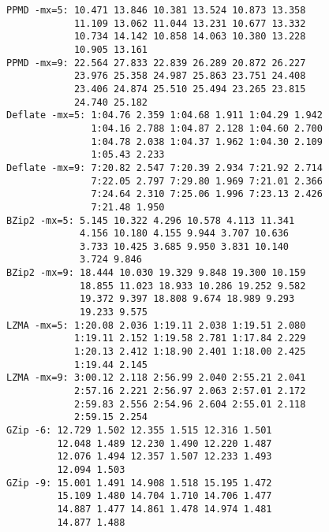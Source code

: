 \begin{verbatim}
PPMD -mx=5: 10.471 13.846 10.381 13.524 10.873 13.358
            11.109 13.062 11.044 13.231 10.677 13.332
            10.734 14.142 10.858 14.063 10.380 13.228
            10.905 13.161
PPMD -mx=9: 22.564 27.833 22.839 26.289 20.872 26.227
            23.976 25.358 24.987 25.863 23.751 24.408
            23.406 24.874 25.510 25.494 23.265 23.815
            24.740 25.182
Deflate -mx=5: 1:04.76 2.359 1:04.68 1.911 1:04.29 1.942
               1:04.16 2.788 1:04.87 2.128 1:04.60 2.700
               1:04.78 2.038 1:04.37 1.962 1:04.30 2.109
               1:05.43 2.233
Deflate -mx=9: 7:20.82 2.547 7:20.39 2.934 7:21.92 2.714
               7:22.05 2.797 7:29.80 1.969 7:21.01 2.366
               7:24.64 2.310 7:25.06 1.996 7:23.13 2.426
               7:21.48 1.950
BZip2 -mx=5: 5.145 10.322 4.296 10.578 4.113 11.341
             4.156 10.180 4.155 9.944 3.707 10.636
             3.733 10.425 3.685 9.950 3.831 10.140
             3.724 9.846
BZip2 -mx=9: 18.444 10.030 19.329 9.848 19.300 10.159
             18.855 11.023 18.933 10.286 19.252 9.582
             19.372 9.397 18.808 9.674 18.989 9.293
             19.233 9.575
LZMA -mx=5: 1:20.08 2.036 1:19.11 2.038 1:19.51 2.080
            1:19.11 2.152 1:19.58 2.781 1:17.84 2.229
            1:20.13 2.412 1:18.90 2.401 1:18.00 2.425
            1:19.44 2.145
LZMA -mx=9: 3:00.12 2.118 2:56.99 2.040 2:55.21 2.041
            2:57.16 2.221 2:56.97 2.063 2:57.01 2.172
            2:59.83 2.556 2:54.96 2.604 2:55.01 2.118
            2:59.15 2.254
GZip -6: 12.729 1.502 12.355 1.515 12.316 1.501
         12.048 1.489 12.230 1.490 12.220 1.487
         12.076 1.494 12.357 1.507 12.233 1.493
         12.094 1.503
GZip -9: 15.001 1.491 14.908 1.518 15.195 1.472
         15.109 1.480 14.704 1.710 14.706 1.477
         14.887 1.477 14.861 1.478 14.974 1.481
         14.877 1.488
\end{verbatim}
